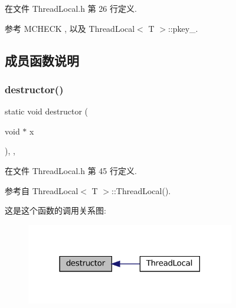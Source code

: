 在文件 Thread\+Local.\+h 第 26 行定义.



参考 M\+C\+H\+E\+CK , 以及 Thread\+Local$<$ T $>$\+::pkey\+\_\+.



\subsection{成员函数说明}
\mbox{\label{classmuduo_1_1ThreadLocal_a1d6d0f9453997bf458b23a4a0028bdb5}} 
\subsubsection{\texorpdfstring{destructor()}{destructor()}}
{\footnotesize\ttfamily static void destructor (\begin{DoxyParamCaption}\item[{void $\ast$}]{x }\end{DoxyParamCaption})\hspace{0.3cm}{\ttfamily [inline]}, {\ttfamily [static]}, {\ttfamily [private]}}



在文件 Thread\+Local.\+h 第 45 行定义.



参考自 Thread\+Local$<$ T $>$\+::\+Thread\+Local().

这是这个函数的调用关系图\+:
\nopagebreak
\begin{figure}[H]
\begin{center}
\leavevmode
\includegraphics[width=258pt]{classmuduo_1_1ThreadLocal_a1d6d0f9453997bf458b23a4a0028bdb5_icgraph}
\end{center}
\end{figure}
\mbox{\label{classmuduo_1_1ThreadLocal_a464298ad7afeafebbb149f566ecabbab}} 

